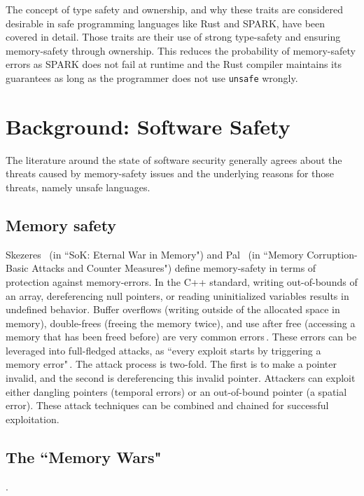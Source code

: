\documentclass[nomenclature, english, bibtex]{kththesis}
\begin{document}
The concept of type safety and ownership, and why these traits are considered desirable in safe programming languages like Rust and SPARK, have been covered in detail. Those traits are their use of strong \gls{type-safety} and ensuring \gls{memory-safety} through \gls{ownership}. This reduces the probability of \gls{memory-safety} errors as SPARK does not fail at runtime and the Rust compiler maintains its guarantees as long as the programmer does not use \texttt{unsafe} wrongly.


\section{Background: Software Safety}
\label{sec:software_safety}

The literature around the state of software security generally agrees about the threats caused by memory-safety issues and the underlying reasons for those threats, namely unsafe languages. 

\subsection{Memory safety}

Skezeres \etal\,\cite{szekeres_sok_2013} (in ``SoK: Eternal War in Memory") and Pal \etal\,\cite{pal_memory_2016} (in ``Memory Corruption-Basic Attacks and Counter Measures") define \gls{memory-safety} in terms of protection against \gls{memory-error}s. 
In the C++ standard, writing out-of-bounds of an array, dereferencing null pointers, or reading uninitialized variables results in undefined behavior. Buffer overflows (writing outside of the allocated space in memory), double-frees (freeing the memory twice), and use after free (accessing a memory that has been freed before) are very common errors\,\cite{szekeres_sok_2013,scherer_engineering_2021}. 
These errors can be leveraged into full-fledged attacks, as ``every exploit starts by triggering a memory error"\,\cite{szekeres_sok_2013}. The attack process is two-fold. The first is to make a pointer invalid, and the second is dereferencing this invalid pointer. Attackers can exploit either dangling pointers (\ie temporal errors) or an out-of-bound pointer (\ie a spatial error). These attack techniques can be combined and chained for successful exploitation. 

\subsection{The ``Memory Wars"}.
\end{document}

